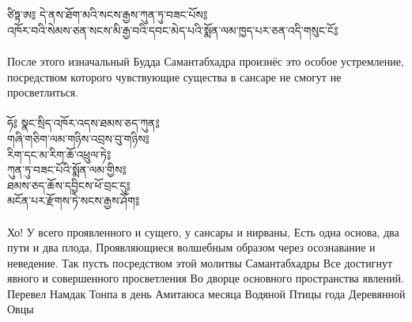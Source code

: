 
\\
\\
{\ti
ཙིཏྟ་ཨ༔
དེ་ནས་ཐོག་མའི་སངས་རྒྱས་ཀུན་ཏུ་བཟང་པོས༔\\
འཁོར་བའི་སེམས་ཅན་སངས་མི་རྒྱ་བའི་དབང་མེད་པའི་སྨོན་ལམ་ཁྱད་པར་ཅན་འདི་གསུང་ངོ༔\\
}
\\
\ru
После этого изначальный Будда Самантабхадра произнёс
это особое устремление, посредством которого
чувствующие существа в сансаре не смогут не просветлиться.\\
\\
{\ti ཧོ༔ སྣང་སྲིད་འཁོར་འདས་ཐམས་ཅད་ཀུན༔\\
གཞི་གཅིག་ལམ་གཉིས་འབྲས་བུ་གཉིས༔ \\
རིག་དང་མ་རིག་ཆོ་འཕྲུལ་ཏེ༔ \\
ཀུན་ཏུ་བཟང་པོའི་སྨོན་ལམ་གྱིས༔ \\
ཐམས་ཅད་ཆོས་དབྱིངས་ཕོ་བྲང་དུ༔ \\
མངོན་པར་རྫོགས་ཏེ་སངས་རྒྱས་ཤོག༔ \\
}
\\
\ru
Хо!
У всего проявленного и сущего, у сансары и нирваны,
Есть одна основа, два пути и два плода,
Проявляющиеся волшебным образом через осознавание и неведение.
Так пусть посредством этой молитвы Самантабхадры
Все достигнут явного и совершенного просветления
Во дворце основного пространства явлений.
\ru
\\
\scriptsize Перевел Намдак Тонпа в день Амитаюса месяца Водяной Птицы года Деревянной Овцы
\normalsize
